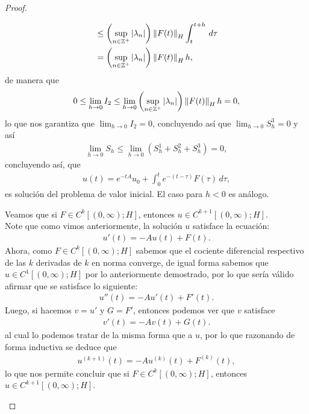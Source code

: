 \begin{proof}
\begin{enumerate}
\begin{align*}
        &\leq \left(\sup_{n \in \mathbb{Z}^+}|\lambda_n|\right)\left\|F(t)\right\|_H\int_{t}^{t+h}\, d\tau\\
        &= \left(\sup_{n \in \mathbb{Z}^+}|\lambda_n|\right)\left\|F(t)\right\|_Hh,
    \end{align*}
    de manera que 
    \begin{align*}
        0\leq \lim_{h\to 0}I_2\leq \lim_{h\to 0}\left(\sup_{n \in \mathbb{Z}^+}|\lambda_n|\right)\left\|F(t)\right\|_Hh=0,
    \end{align*}
    lo que nos garantiza que $\displaystyle \lim_{h\to 0}I_2=0$, concluyendo así que $\displaystyle \lim_{h\to 0}S_h^3=0$ y así
    \begin{align*}
        \lim_{h\to 0} S_h\leq \lim_{h\to 0}(S_h^1+S_h^2+S_h^3)=0,
    \end{align*}
    concluyendo así, que 
    \begin{align*}
        u(t)=e^{-tA}u_0+\int_0^t e^{-(t-\tau)}F(\tau)\, d\tau,
    \end{align*}
    es solución del problema de valor inicial. El caso para $h<0$ es análogo.

    Veamos que si $F\in C^{k}[(0,\infty);H]$, entonces $u\in C^{k+1}[(0,\infty);H]$.\\
    Note que como vimos anteriormente, la solución $u$ satisface la ecuación:
    \begin{align*}
        u'(t)=-Au(t)+F(t).
    \end{align*}
    Ahora, como $F\in C^{k}[(0,\infty);H]$ sabemos que el cociente diferencial respectivo de las $k$ derivadas de $k$ en norma converge, de igual forma sabemos que $u\in C^{1}[(0,\infty);H]$ por lo anteriormente demostrado, por lo que sería válido afirmar que se satisface lo siguiente:
    \begin{align*}
        u''(t)=-Au'(t)+F'(t).
    \end{align*}
    Luego, si hacemos $v=u'$ y $G=F'$, entonces podemos ver que $v$ satisface
    \begin{align*}
        v'(t)=-Av(t)+G(t).
    \end{align*}
    al cual lo podemos tratar de la misma forma que a $u$, por lo que razonando de forma inductiva se deduce que
    \begin{align*}
        u^{(k+1)}(t)=-Au^{(k)}(t)+F^{(k)}(t),
    \end{align*}
    lo que nos permite concluir que si $F\in C^{k}[(0,\infty);H]$, entonces $u\in C^{k+1}[(0,\infty);H]$.
  \end{enumerate} 
\end{proof}
